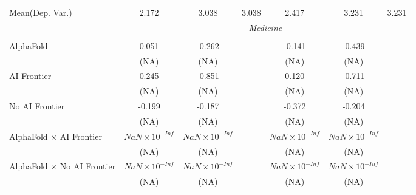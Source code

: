 \begin{tabular}{lcccccc}
Mean(Dep. Var.) & 2.172 & 3.038 & 3.038 & 2.417 & 3.231 & 3.231 \\
 & \multicolumn{6}{c}{\textit{Medicine}} \\ \\
   AlphaFold                                                                  & 0.051                  & -0.262                 &                        & -0.141                 & -0.439                 &   \\   
                                                                              & (NA)                   & (NA)                   &                        & (NA)                   & (NA)                   &   \\   
   AI Frontier                                                                & 0.245                  & -0.851                 &                        & 0.120                  & -0.711                 &   \\   
                                                                              & (NA)                   & (NA)                   &                        & (NA)                   & (NA)                   &   \\   
   No AI Frontier                                                             & -0.199                 & -0.187                 &                        & -0.372                 & -0.204                 &   \\   
                                                                              & (NA)                   & (NA)                   &                        & (NA)                   & (NA)                   &   \\   
   AlphaFold $\times$ AI Frontier                                             & $NaN\times 10^{-Inf}$  & $NaN\times 10^{-Inf}$  &                        & $NaN\times 10^{-Inf}$  & $NaN\times 10^{-Inf}$  &   \\   
                                                                              & (NA)                   & (NA)                   &                        & (NA)                   & (NA)                   &   \\   
   AlphaFold $\times$ No AI Frontier                                          & $NaN\times 10^{-Inf}$  & $NaN\times 10^{-Inf}$  &                        & $NaN\times 10^{-Inf}$  & $NaN\times 10^{-Inf}$  &   \\   
                                                                              & (NA)                   & (NA)                   &                        & (NA)                   & (NA)                   &   \\   

\end{tabular}
